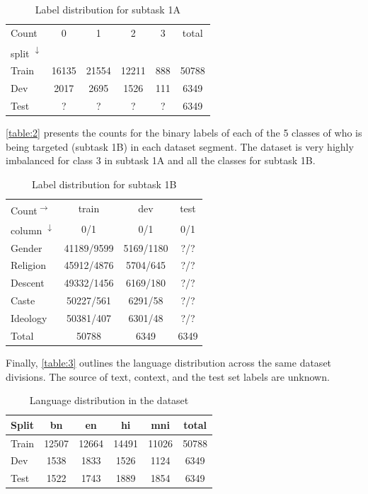 \documentclass[10pt, a4paper]{article}
\begin{document}
\begin{table}[h!]
\begin{center}
\begin{tabular}{|l|c|c|c|c|c|}
\hline
Count & 0 & 1 & 2 & 3 & total \\
split \textsuperscript{$\downarrow$} &  &  &  &  &  \\
\hline
Train & 16135 & 21554 & 12211 & 888 & 50788 \\
Dev & 2017 & 2695 & 1526 & 111 & 6349 \\
Test & ? & ? & ? & ? & 6349 \\
\hline
\end{tabular}
\caption{Label distribution for subtask 1A}
\label{table:1}
\end{center}
\end{table}

 \autoref{table:2} presents the counts for the binary labels of each of the 5 classes of who is being targeted (subtask 1B) in each dataset segment. The dataset is very highly imbalanced for class 3 in subtask 1A and all the classes for subtask 1B.
 
\begin{table}[h!]
\begin{center}
\begin{tabular}{|l|c|c|c|}
\hline
Count\textsuperscript{$\rightarrow$} & train & dev & test  \\
column \textsuperscript{$\downarrow$} & 0/1 & 0/1 & 0/1  \\
\hline
Gender & 41189/9599 & 5169/1180 & ?/? \\
Religion & 45912/4876 & 5704/645 & ?/? \\
Descent & 49332/1456 & 6169/180 & ?/? \\
Caste & 50227/561 & 6291/58 & ?/? \\
Ideology & 50381/407 & 6301/48 & ?/? \\
\hline
Total & 50788 & 6349 & 6349 \\
\hline
\end{tabular}
\caption{Label distribution for subtask 1B}
\label{table:2}
\end{center}
\end{table}

 Finally, \autoref{table:3} outlines the language distribution across the same dataset divisions. The source of text, context, and the test set labels are unknown.
 
\begin{table}[h!]
\begin{center}
\begin{tabular}{|l|c|c|c|c|c|}
\hline
Split & bn & en & hi & mni & total \\
\hline
Train & 12507 & 12664 & 14491 & 11026 & 50788 \\
Dev & 1538 & 1833 & 1526 & 1124 & 6349 \\
Test & 1522 & 1743 & 1889 & 1854 & 6349 \\
\hline
\end{tabular}
\caption{Language distribution in the dataset}
\label{table:3}
\end{center}
\end{table}
\end{document}
